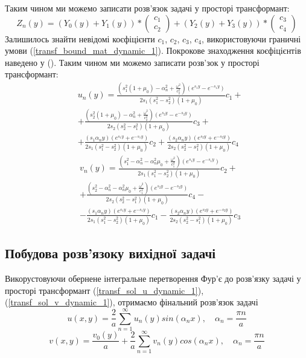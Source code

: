 Таким чином ми можемо записати розв'язок задачі у просторі трансформант:
\begin{equation}
    Z_n(y) =\left( Y_0(y) +  Y_1(y)  \right) * \begin{pmatrix} c_1 \\ c_2 \end{pmatrix} + \left( Y_2(y) +  Y_3(y) \right) * \begin{pmatrix} c_3 \\ c_4 \end{pmatrix}
\end{equation}
Залишилось знайти невідомі коєфіцієнти $c_1$, $c_2$, $c_3$, $c_4$, використовуючи граничні умови (\ref{transf_bound_mat_dynamic_1}).
Покрокове знаходження коєфіцієнтів наведено у ().
Таким чином ми можемо записати розв'зок у просторі трансформант:
\begin{align}\label{transf_sol_u_dynamic_1}
    &u_n(y) = \frac{( s_1^2 (1 + \mu_0) -\alpha_n^2 + \frac{\omega^2}{c_2^2})(e^{s_1y} - e^{-s_1y})}{2s_1(s_1^2 - s_2^2)(1 + \mu_0)}c_1 + \nonumber \\
    & + \frac{( s_2^2 (1 + \mu_0) -\alpha_n^2 + \frac{\omega^2}{c_2^2})(e^{s_2y} - e^{-s_2y})}{2s_2(s_2^2 - s_1^2)(1 + \mu_0)}c_3 + \nonumber \\
    & + \frac{( s_1 \alpha_n y)(e^{s_1y} + e^{-s_1y})}{2s_1(s_1^2 - s_2^2)(1 + \mu_0)}c_2 + \frac{(s_2 \alpha_n y)(e^{s_2y} + e^{-s_2y})}{2s_2(s_2^2 - s_1^2)(1 + \mu_0)}c_4
\end{align}
\begin{align}\label{transf_sol_v_dynamic_1}
    &v_n(y) = \frac{(s_1^2 - \alpha_n^2 - \alpha_n^2\mu_0 + \frac{\omega^2}{c_1^2})(e^{s_1y} - e^{-s_1y})}{2s_1(s_1^2 - s_2^2)(1 + \mu_0)}c_2 + \nonumber \\
    & +\frac{(s_2^2 - \alpha_n^2 - \alpha_n^2\mu_0 + \frac{\omega^2}{c_1^2})(e^{s_2y} - e^{-s_2y})}{2s_2(s_2^2 - s_1^2)(1 + \mu_0)}c_4 - \nonumber \\
    & - \frac{(s_1 \alpha_n y)(e^{s_1y} + e^{-s_1y})}{2s_1(s_1^2 - s_2^2)(1 + \mu_0)}c_1 - \frac{(s_2 \alpha_n y)(e^{s_2y} + e^{-s_2y})}{2s_2(s_2^2 - s_1^2)(1 + \mu_0)}c_3
\end{align}

\subsection{Побудова розв'язоку вихідної задачі}
Викорустовуючи обернене інтегральне перетворення Фур'є до розв'язку задачі у просторі трансформант
(\ref{transf_sol_u_dynamic_1}), (\ref{transf_sol_v_dynamic_1}), отримаємо фінальний розв'язок задачі
\begin{equation}
    u(x,y) = \frac{2}{a} \sum_{n=1}^{\infty} u_n(y) sin(\alpha_n x), \quad \alpha_n = \frac{\pi n}{a}
\end{equation}
\begin{equation}
    v(x,y) = \frac{v_0(y)}{a} + \frac{2}{a} \sum_{n=1}^{\infty} v_n(y) cos(\alpha_n x), \quad \alpha_n = \frac{\pi n}{a}
\end{equation}

